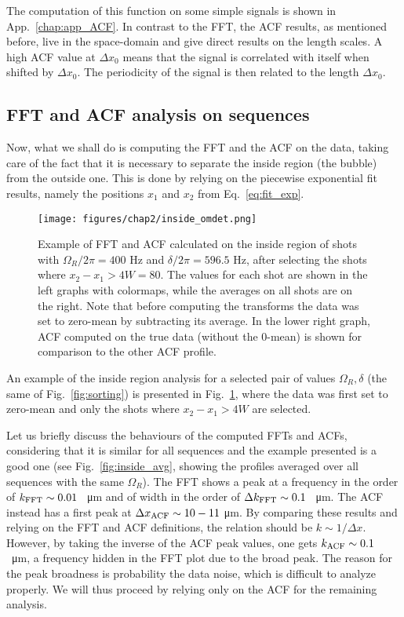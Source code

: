 The computation of this function on some simple signals is shown in App.\ \ref{chap:app_ACF}. In contrast to the FFT, the ACF results, as mentioned before, live in the space-domain and give direct results on the length scales. A high ACF value at $\Delta x_0$ means that the signal is correlated with itself when shifted by $\Delta x_0$. The periodicity of the signal is then related to the length $\Delta x_0$.

\subsection{FFT and ACF analysis on sequences}
Now, what we shall do is computing the FFT and the ACF on the data, taking care of the fact that it is necessary to separate the inside region (the bubble) from the outside one. This is done by relying on the piecewise exponential fit results, namely the positions $x_1$ and $x_2$ from Eq.\ \eqref{eq:fit_exp}.
\begin{figure}[ht!]
    \centering
    \texttt{[image: figures/chap2/inside\_omdet.png]}
    \caption{Example of FFT and ACF calculated on the inside region of shots with $\Omega_R/2\pi = 400$ \unit{\hertz} and $\delta/2\pi = 596.5$ \unit{\hertz}, after selecting the shots where $x_2-x_1 > 4W = 80$. The values for each shot are shown in the left graphs with colormaps, while the averages on all shots are on the right. Note that before computing the transforms the data was set to zero-mean by subtracting its average. In the lower right graph, ACF computed on the true data (without the 0-mean) is shown for comparison to the other ACF profile.}
    \label{fig:inside_00}
\end{figure}
An example of the inside region analysis for a selected pair of values $\Omega_R, \delta$ (the same of Fig.\ \ref{fig:sorting}) is presented in Fig.\ \ref{fig:inside_00}, where the data was first set to zero-mean and only the shots where $x_2-x_1 > 4W$ are selected.

Let us briefly discuss the behaviours of the computed FFTs and ACFs, considering that it is similar for all sequences and the example presented is a good one (see Fig.\ \ref{fig:inside_avg}, showing the profiles averaged over all sequences with the same $\Omega_R$). The FFT shows a peak at a frequency in the order of $k_{\rm FFT} \sim 0.01$ \unit{\per\micro\meter} and of width in the order of $\Delta k_{\rm FFT} \sim 0.1$ \unit{\per\micro\meter}. The ACF instead has a first peak at $\Delta x_{\rm ACF} \sim 10-11$ \unit{\micro\meter}. By comparing these results and relying on the FFT and ACF definitions, the relation should be $k \sim 1/\Delta x$. However, by taking the inverse of the ACF peak values, one gets $k_{\rm ACF} \sim 0.1$ \unit{\per\micro\meter}, a frequency hidden in the FFT plot due to the broad peak. The reason for the peak broadness is probability the data noise, which is difficult to analyze properly. We will thus proceed by relying only on the ACF for the remaining analysis.

